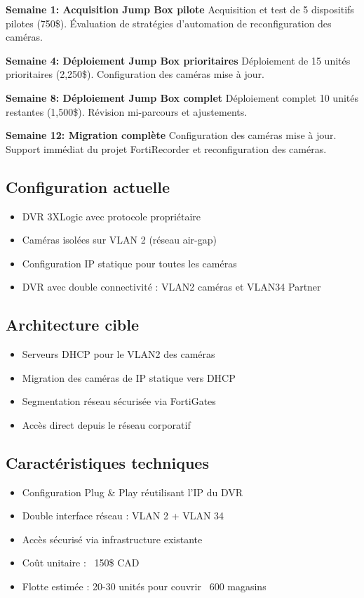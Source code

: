 \documentclass{UTT-Books-44}
\begin{document}
\textbf{Semaine 1: Acquisition Jump Box pilote}
Acquisition et test de 5 dispositifs pilotes (750\$). Évaluation de stratégies d'automation de reconfiguration des caméras.

\textbf{Semaine 4: Déploiement Jump Box prioritaires}
Déploiement de 15 unités prioritaires (2,250\$). Configuration des caméras mise à jour.

\textbf{Semaine 8: Déploiement Jump Box complet}
Déploiement complet 10 unités restantes (1,500\$). Révision mi-parcours et ajustements.

\textbf{Semaine 12: Migration complète}
Configuration des caméras mise à jour. Support immédiat du projet FortiRecorder et reconfiguration des caméras.


\subsection{Configuration actuelle}
\begin{itemize}
\item DVR 3XLogic avec protocole propriétaire
\item Caméras isolées sur VLAN 2 (réseau air-gap)
\item Configuration IP statique pour toutes les caméras
\item DVR avec double connectivité : VLAN2 caméras et VLAN34 Partner
\end{itemize}

\subsection{Architecture cible}
\begin{itemize}
\item Serveurs DHCP pour le VLAN2 des caméras
\item Migration des caméras de IP statique vers DHCP
\item Segmentation réseau sécurisée via FortiGates
\item Accès direct depuis le réseau corporatif
\end{itemize}


\subsection{Caractéristiques techniques}
\begin{itemize}
\item Configuration Plug \& Play réutilisant l'IP du DVR
\item Double interface réseau : VLAN 2 + VLAN 34
\item Accès sécurisé via infrastructure existante
\item Coût unitaire : ~150\$ CAD
\item Flotte estimée : 20-30 unités pour couvrir ~600 magasins
\end{itemize}
\end{document}
